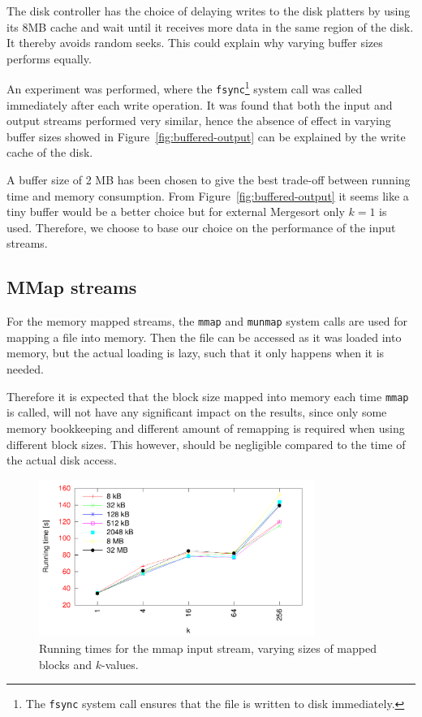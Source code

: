 \documentclass[a4paper,12pt]{article}
\begin{document}
The disk controller has the choice of delaying writes to the disk platters by using its 8MB cache and wait until it receives more data in the same region of the disk. It thereby avoids random seeks. This could explain why varying buffer sizes performs equally.

An experiment was performed, where the
\texttt{fsync}\footnote{The \texttt{fsync} system call ensures
  that the file is written to disk immediately.} system call was
called immediately after each write operation. It was found that both
the input and output streams performed very similar, hence the absence
of effect in varying buffer sizes showed in
Figure~\ref{fig:buffered-output} can be explained by the write cache of the disk.

A buffer size of 2 MB has been chosen to give the best trade-off
between running time and memory consumption. From
Figure~\ref{fig:buffered-output} it seems like a tiny buffer would be
a better choice but for external Mergesort only $k=1$ is used. Therefore, we choose to base our choice on the performance of the input streams.

\subsection{MMap streams}
For the memory mapped streams, the \texttt{mmap} and \texttt{munmap}
system calls are used for mapping a file into memory. Then the file
can be accessed as it was loaded into memory, but the actual loading
is lazy, such that it only happens when it is needed.

Therefore it is expected that the block size mapped into memory each
time \texttt{mmap} is called, will not have any significant impact on
the results, since only some memory bookkeeping and different amount
of remapping is required when using different block sizes. This
however, should be negligible compared to the time of the actual disk
access.

\begin{figure}[h!]
  \centering
  \includegraphics[width=0.8\textwidth]{mmap_input}
  \caption{Running times for the mmap input stream, varying sizes of
    mapped blocks and $k$-values.}
  \label{fig:mmap-input}
\end{figure}
\end{document}
